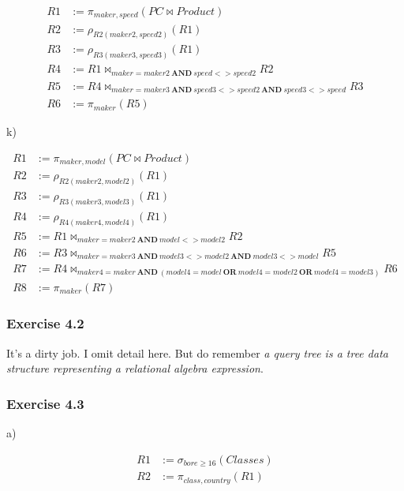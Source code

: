 \documentclass[../../main.tex]{subfiles}
\begin{document}
\begin{align*}
  R1 &:= \pi_{maker, speed}(PC \bowtie Product) \\
  R2 &:= \rho_{R2(maker2, speed2)}(R1) \\
  R3 &:= \rho_{R3(maker3, speed3)}(R1) \\
  R4 &:= R1 \bowtie_{maker = maker2 \ \mathbf{AND} \ speed <> speed2} R2 \\
  R5 &:= R4 \bowtie_{maker = maker3 \ \mathbf{AND} \ speed3 <> speed2
         \ \mathbf{AND} \ speed3 <> speed} R3 \\
  R6 &:= \pi_{maker}(R5)
\end{align*}

k)

\begin{align*}
  R1 &:= \pi_{maker, model}(PC \bowtie Product) \\
  R2 &:= \rho_{R2(maker2, model2)}(R1) \\
  R3 &:= \rho_{R3(maker3, model3)}(R1) \\
  R4 &:= \rho_{R4(maker4, model4)}(R1) \\
  R5 &:= R1 \bowtie_{maker=maker2 \ \mathbf{AND} \ model <> model2} R2 \\
  R6 &:= R3 \bowtie_{maker=maker3 \ \mathbf{AND} \ model3 <> model2
         \ \mathbf{AND} \ model3 <> model}R5 \\
  R7 &:= R4 \bowtie_{maker4=maker \ \mathbf{AND} \ (model4 = model \ \mathbf{OR} \
         model4 = model2 \ \mathbf{OR} \ model4 = model3)} R6 \\
  R8 &:= \pi_{maker}(R7)
\end{align*}

\subsubsection*{Exercise 4.2}

It's a dirty job. I omit detail here. But do remember
\emph{a query tree is a tree data structure representing
a relational algebra expression}.

\subsubsection*{Exercise 4.3}

a)

\begin{align*}
  R1 &:= \sigma_{bore \geq 16}(Classes) \\
  R2 &:= \pi_{class,country}(R1)
\end{align*}
\end{document}
